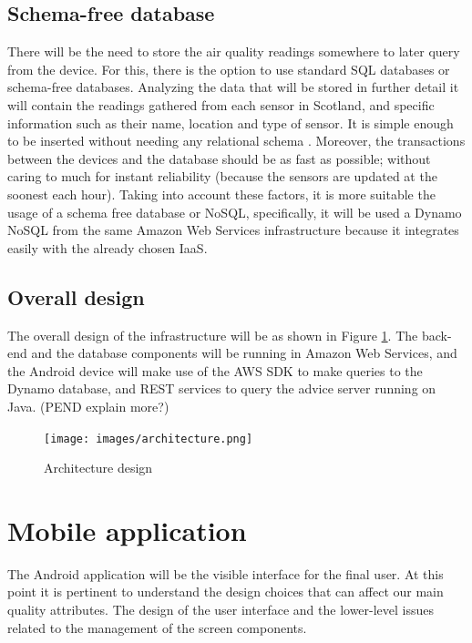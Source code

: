 \subsection{Schema-free database}
There will be the need to store the air quality readings somewhere to later query from the device. For this, there is the option to use standard SQL databases or schema-free databases. Analyzing the data that will be stored in further detail it will contain the readings gathered from each sensor in Scotland, and specific information such as their name, location and type of sensor. It is simple enough to be inserted without needing any relational schema . Moreover, the transactions between the devices and the database should be as fast as possible; without caring to much for instant reliability (because the sensors are updated at the soonest each hour). Taking into account these factors, it is more suitable the usage of a schema free database or NoSQL, specifically, it will be used a Dynamo NoSQL from the same Amazon Web Services infrastructure because it integrates easily with the already chosen IaaS. 

\subsection{Overall design}
The overall design of the infrastructure will be as shown in Figure \ref{fig:architecture}. The back-end and the database components will be running in Amazon Web Services, and the Android device will make use of the AWS SDK to make queries to the Dynamo database, and REST services to query the advice server running on Java. (PEND explain more?)

\begin{figure}[H]
\begin{adjustbox}{width=.8\textwidth,center=\textwidth}
  \centering
  \texttt{[image: images/architecture.png]}
\end{adjustbox}
  \caption[Architecture design]{Architecture design}
  \label{fig:architecture}
\end{figure}

\section{Mobile application}
The Android application will be the visible interface for the final user. At this point it is pertinent to understand the design choices that can affect our main quality attributes. The design of the user interface and the lower-level issues related to the management of the screen components. 

